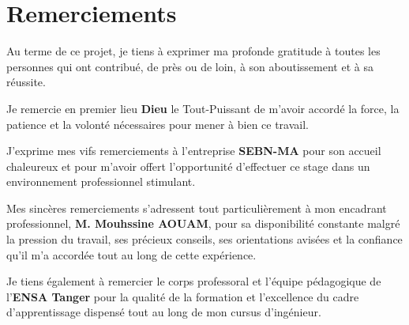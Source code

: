 \chapter*{Remerciements}

Au terme de ce projet, je tiens à exprimer ma profonde gratitude à toutes les personnes qui ont contribué, de près ou de loin, à son aboutissement et à sa réussite.

\vspace{0.4cm}

Je remercie en premier lieu \textbf{Dieu} le Tout-Puissant de m'avoir accordé la force, la patience et la volonté nécessaires pour mener à bien ce travail.

\vspace{0.4cm}

J'exprime mes vifs remerciements à l'entreprise \textbf{SEBN-MA} pour son accueil chaleureux et pour m'avoir offert l'opportunité d'effectuer ce stage dans un environnement professionnel stimulant.

\vspace{0.4cm}

Mes sincères remerciements s'adressent tout particulièrement à mon encadrant professionnel, \textbf{M. Mouhssine AOUAM}, pour sa disponibilité constante malgré la pression du travail, ses précieux conseils, ses orientations avisées et la confiance qu'il m'a accordée tout au long de cette expérience.

\vspace{0.4cm}

Je tiens également à remercier le corps professoral et l'équipe pédagogique de l'\textbf{ENSA Tanger} pour la qualité de la formation et l'excellence du cadre d'apprentissage dispensé tout au long de mon cursus d'ingénieur.
